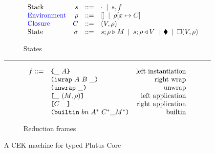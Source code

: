 \documentclass[../plutus-core-specification.tex]{subfiles}
\begin{document}
\begin{figure}[!ht]
\begin{subfigure}[c]{\linewidth}        %
\[
\begin{array}{lrcl}
        \textrm{Stack} & s      & ::= & \cdot \enspace | \enspace s,f    \\
        \textcolor{blue}{ \textrm{Environment}} & \rho & ::= & [] \enspace | \enspace \rho[x \mapsto C] \\
        \textcolor{blue}{ \textrm{Closure}} & C  & ::= & (V,\rho) \\
        \textrm{State} & \sigma & ::= & s;\rho \triangleright M \enspace | \enspace s;\rho \triangleleft V  \enspace | \enspace \blacklozenge{} \enspace | \enspace \square (V,\rho)
    \end{array}
\]
\caption{States}
\end{subfigure}

\vspace{1mm}
\hrule
\vspace{2mm}

\begin{subfigure}[c]{\linewidth}  %
\[
    \begin{array}{rlr}
       f ::= & \texttt{\{}\_ ~ A\texttt{\}}                     & \textrm{left instantiation}\\
             & \texttt{(} \texttt{iwrap} ~ A ~ B ~ \_ \texttt{)}            & \textrm{right wrap}\\
             & \texttt{(} \texttt{unwrap} ~ \_ \texttt{)}{}                        & \textrm{unwrap}\\
             & \texttt{[} \_ ~ (M,\rho) \texttt{]}                 & \textrm{left application}\\
             & \texttt{[} C ~ \_ \texttt{]}                & \textrm{right application}\\
             & \texttt{(} \texttt{builtin} ~ bn ~ A^* ~ C^* \_ M^* \texttt{)}        & \textrm{builtin}\\
    \end{array}
\]
\caption{Reduction frames}
\end{subfigure}

\caption{A CEK machine for typed Plutus Core}
\end{figure}
\end{document}
